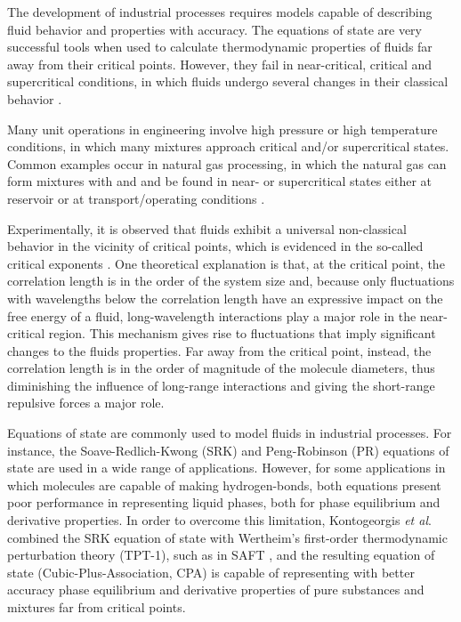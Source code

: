 \documentclass[preprint,12pt,3p]{elsarticle}
\begin{document}
    The development of industrial processes requires models capable of describing fluid behavior and properties with accuracy. The equations of state are very successful tools when used to calculate thermodynamic properties of fluids far away from their critical points. However, they fail in near-critical, critical and supercritical conditions, in which fluids undergo several changes in their classical behavior \cite{sengers1986thermodynamic}.
    
	Many unit operations in engineering involve high pressure or high temperature conditions, in which many mixtures approach critical and/or supercritical states. Common examples occur in natural gas processing, in which the natural gas can form mixtures with  and  and be found in near- or supercritical states either at reservoir or at transport/operating conditions  \citep{kermani2003carbon}.

    Experimentally, it is observed that fluids exhibit a universal non-classical behavior in the vicinity of critical points, which is evidenced in the so-called critical exponents \citep{carles2010brief}. One theoretical explanation is that, at the critical point, the correlation length is in the order of the system size and, because only fluctuations with wavelengths below the correlation length have an expressive impact on the free energy of a fluid, long-wavelength interactions play a major role in the near-critical region. This mechanism gives rise to fluctuations that imply significant changes to the fluids properties. Far away from the critical point, instead, the correlation length is in the order of magnitude of the molecule diameters, thus diminishing the influence of long-range interactions and giving the short-range repulsive forces a major role.
    
    Equations of state are commonly used to model fluids in industrial processes. For instance, the Soave-Redlich-Kwong (SRK) \cite{soave1972equilibrium} and Peng-Robinson (PR) \cite{peng1976new} equations of state are used in a wide range of applications. However, for some applications in which molecules are capable of making hydrogen-bonds, both equations present poor performance in representing liquid phases, both for phase equilibrium and derivative properties. In order to overcome this limitation, Kontogeorgis \textit{et al}. \citep{kontogeorgis1996equation} combined the SRK equation of state with Wertheim's first-order thermodynamic perturbation theory (TPT-1), such as in SAFT \citep{chapman1990new}, and the resulting equation of state (Cubic-Plus-Association, CPA) is capable of representing with better accuracy phase equilibrium and derivative properties of pure substances and mixtures far from critical points.
    
\end{document}
